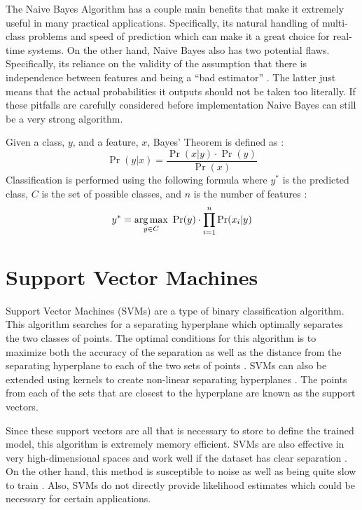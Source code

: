 The Naive Bayes Algorithm has a couple main benefits that make it extremely useful in many practical applications. Specifically, its natural handling of multi-class problems and speed of prediction which can make it a great choice for real-time systems. On the other hand, Naive Bayes also has two potential flaws. Specifically, its reliance on the validity of the assumption that there is independence between features and being a ``bad estimator'' \cite{NaiveBayesEstimator}. The latter just means that the actual probabilities it outputs should not be taken too literally. If these pitfalls are carefully considered before implementation Naive Bayes can still be a very strong algorithm.

Given a class, $y$, and a feature, $x$, Bayes' Theorem is defined as \cite{NaiveBayesOG}:
$$\Pr(y \vert x) = \frac{\Pr(x \vert y) \cdot \Pr(y)}{\Pr(x)}$$
Classification is performed using the following formula where $y^*$ is the predicted class, $C$ is the set of possible classes, and $n$ is the number of features \cite{NaiveBayesOG}:
$$y^* = \operatorname*{arg\,max}_{y \in C}~\Pr(y) \cdot \prod\limits_{i=1}^n \Pr(x_i \vert y)$$



\section{Support Vector Machines}
Support Vector Machines (SVMs) are a type of binary classification algorithm. This algorithm searches for a separating hyperplane which optimally separates the two classes of points. The optimal conditions for this algorithm is to maximize both the accuracy of the separation as well as the distance from the separating hyperplane to each of the two sets of points \cite{SVM}. SVMs can also be extended using kernels to create non-linear separating hyperplanes \cite{SVM}. The points from each of the sets that are closest to the hyperplane are known as the support vectors.

Since these support vectors are all that is necessary to store to define the trained model, this algorithm is extremely memory efficient. SVMs are also effective in very high-dimensional spaces and work well if the dataset has clear separation \cite{SVM}. On the other hand, this method is susceptible to noise as well as being quite slow to train \cite{SVMSpeed}. Also, SVMs do not directly provide likelihood estimates which could be necessary for certain applications.

